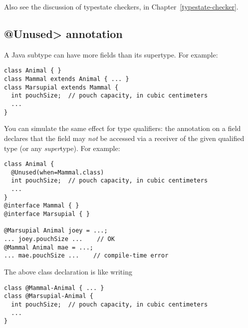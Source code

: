 Also see the discussion of typestate checkers, in
Chapter~\ref{typestate-checker}.


\subsection{\<@Unused> annotation\label{unused-annotation}}

A Java subtype can have more fields than its supertype.  For example:

\begin{Verbatim}
class Animal { }
class Mammal extends Animal { ... }
class Marsupial extends Mammal {
  int pouchSize;  // pouch capacity, in cubic centimeters
  ...
}
\end{Verbatim}

You can simulate
the same effect for type qualifiers:
the  annotation
on a field declares that the field may \emph{not} be accessed via a receiver of
the given qualified type (or any \emph{super}type).
For example:

\begin{Verbatim}
class Animal {
  @Unused(when=Mammal.class)
  int pouchSize;  // pouch capacity, in cubic centimeters
  ...
}
@interface Mammal { }
@interface Marsupial { }

@Marsupial Animal joey = ...;
... joey.pouchSize ...    // OK
@Mammal Animal mae = ...;
... mae.pouchSize ...    // compile-time error
\end{Verbatim}

The above class declaration is like writing

\begin{Verbatim}
class @Mammal-Animal { ... }
class @Marsupial-Animal {
  int pouchSize;  // pouch capacity, in cubic centimeters
  ...
}
\end{Verbatim}


